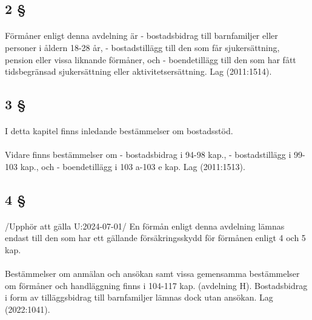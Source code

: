 \documentclass[a4paper,notitlepage,openany,10pt]{book}
\begin{document}
\subsection*{2 §}
\paragraph*{}
Förmåner enligt denna avdelning är
\newline - bostadsbidrag till barnfamiljer eller personer i åldern 18-28 år,
\newline - bostadstillägg till den som får sjukersättning, pension eller vissa liknande förmåner, och
\newline - boendetillägg till den som har fått tidsbegränsad sjukersättning eller aktivitetsersättning.
Lag (2011:1514).
\subsection*{3 §}
\paragraph*{}
I detta kapitel finns inledande bestämmelser om bostadsstöd.
\paragraph*{}
Vidare finns bestämmelser om
\newline - bostadsbidrag i 94-98 kap.,
\newline - bostadstillägg i 99-103 kap., och
\newline - boendetillägg i 103 a-103 e kap.
Lag (2011:1513).
\subsection*{4 §}
\paragraph*{}
/Upphör att gälla U:2024-07-01/
En förmån enligt denna avdelning lämnas endast till den som har ett gällande försäkringsskydd för förmånen enligt 4 och 5 kap.
\paragraph*{}
Bestämmelser om anmälan och ansökan samt vissa gemensamma bestämmelser om förmåner och handläggning finns i 104-117 kap. (avdelning H). Bostadsbidrag i form av tilläggsbidrag till barnfamiljer lämnas dock utan ansökan.
Lag (2022:1041).
\end{document}
